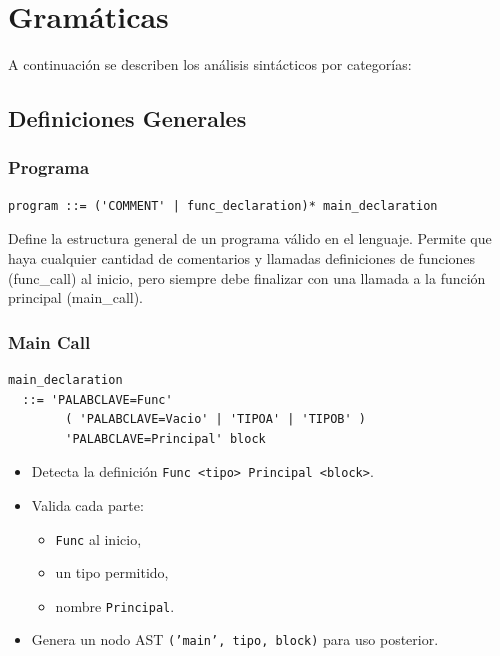 \documentclass{article}
\begin{document}
\section{Gramáticas}\label{sec:grammar}

A continuación se describen los análisis sintácticos por categorías:

\subsection{Definiciones Generales}

\subsubsection*{Programa}

\begin{verbatim}
program ::= ('COMMENT' | func_declaration)* main_declaration
\end{verbatim}

Define la estructura general de un programa válido en el lenguaje. 
Permite que haya cualquier cantidad de comentarios y llamadas
definiciones de funciones (func\_call) al inicio, 
pero siempre debe finalizar con una llamada a la función principal 
(main\_call).

\subsubsection*{Main Call}

\begin{verbatim}
main_declaration
  ::= 'PALABCLAVE=Func' 
        ( 'PALABCLAVE=Vacio' | 'TIPOA' | 'TIPOB' ) 
        'PALABCLAVE=Principal' block
\end{verbatim}

\begin{itemize}
    \item Detecta la definición \texttt{Func <tipo> Principal <block>}.
    \item Valida cada parte:
    \begin{itemize}
        \item \texttt{Func} al inicio,
        \item un tipo permitido,
        \item nombre \texttt{Principal}.
    \end{itemize}
    \item Genera un nodo AST \texttt{('main', tipo, block)} para uso 
      posterior.
\end{itemize}
\end{document}
